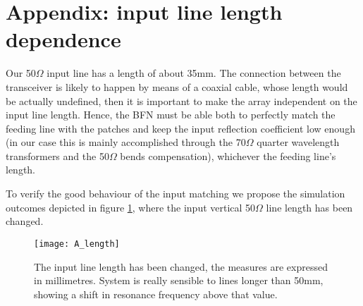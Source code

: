 \newpage
\section{Appendix: input line length dependence}

Our 50$\Omega$ input line has a length of about 35mm. The connection between the transceiver is likely to happen by means of a coaxial cable, whose length would be actually undefined, then it is important to make the array independent on the input line length. Hence, the BFN must be able both to perfectly match the feeding line with the patches and keep the input reflection coefficient low enough (in our case this is mainly accomplished through the 70$\Omega$ quarter wavelength transformers and the 50$\Omega$ bends compensation), whichever the feeding line's length.

To verify the good behaviour of the input matching we propose the simulation outcomes depicted in figure \ref{fig:A_INlineL}, where the input vertical 50$\Omega$ line length has been changed. 

\begin{figure}[H] 
	\centering
	\texttt{[image: A\_length]}
	\caption{The input line length has been changed, the measures are expressed in millimetres. System is really sensible to lines longer than 50mm, showing a shift in resonance frequency above that value.}
	\label{fig:A_INlineL}
\end{figure}
